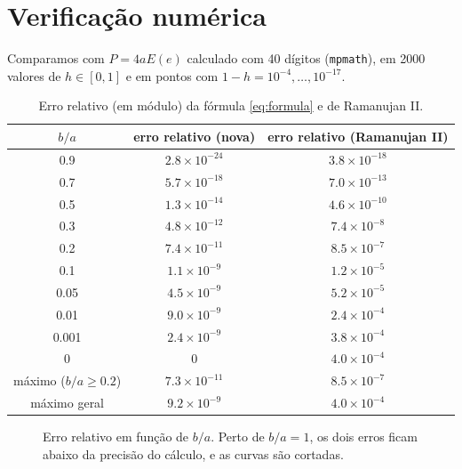\documentclass[11pt,a4paper]{article}
\theoremstyle{remark}
\begin{document}
\section{Verificação numérica}

Comparamos com $P=4aE(e)$ calculado com 40 dígitos (\texttt{mpmath}), em 2000
valores de $h\in[0,1]$ e em pontos com $1-h=10^{-4},\dots,10^{-17}$.

\begin{table}[H]
\centering
\begin{tabular}{ccc}
\toprule
$b/a$ & erro relativo (nova) & erro relativo (Ramanujan II)\\
\midrule
0.9   & $2.8\times10^{-24}$ & $3.8\times10^{-18}$\\
0.7   & $5.7\times10^{-18}$ & $7.0\times10^{-13}$\\
0.5   & $1.3\times10^{-14}$ & $4.6\times10^{-10}$\\
0.3   & $4.8\times10^{-12}$ & $7.4\times10^{-8}$\\
0.2   & $7.4\times10^{-11}$ & $8.5\times10^{-7}$\\
0.1   & $1.1\times10^{-9}$  & $1.2\times10^{-5}$\\
0.05  & $4.5\times10^{-9}$  & $5.2\times10^{-5}$\\
0.01  & $9.0\times10^{-9}$  & $2.4\times10^{-4}$\\
0.001 & $2.4\times10^{-9}$  & $3.8\times10^{-4}$\\
0     & $0$ & $4.0\times10^{-4}$\\
\midrule
máximo ($b/a\ge0.2$) & $7.3\times10^{-11}$ & $8.5\times10^{-7}$\\
máximo geral & $9.2\times10^{-9}$ & $4.0\times10^{-4}$\\
\bottomrule
\end{tabular}
\caption{Erro relativo (em módulo) da fórmula \eqref{eq:formula} e de Ramanujan II.}
\end{table}

\begin{figure}[H]
\centering
{}
\caption{Erro relativo em função de $b/a$. Perto de $b/a=1$, os dois erros
ficam abaixo da precisão do cálculo, e as curvas são cortadas.}
\end{figure}
\end{document}
